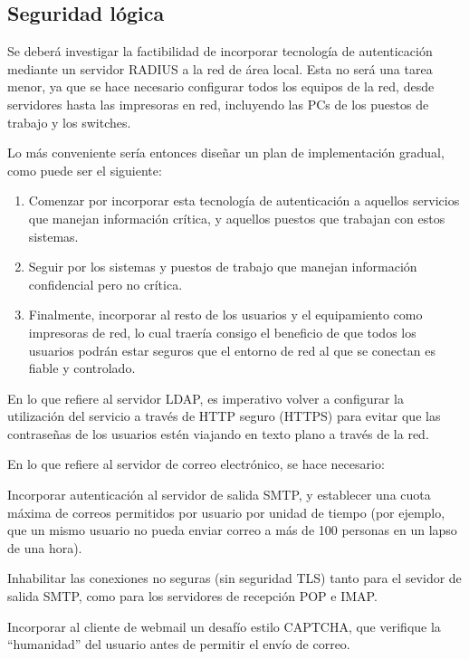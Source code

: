\documentclass[a4paper,11pt,oneside]{article}
\begin{document}
\subsection*{Seguridad lógica}
Se deberá investigar la factibilidad de incorporar tecnología de
autenticación mediante un servidor RADIUS a la red de área local.
Esta no será una tarea menor, ya que se hace necesario configurar todos
los equipos de la red, desde servidores hasta las impresoras en red, incluyendo
las PCs de los puestos de trabajo y los switches.

Lo más conveniente sería entonces diseñar un plan de implementación
gradual, como puede ser el siguiente:
\begin{enumerate}
\item Comenzar por incorporar esta tecnología de autenticación a
  aquellos servicios que manejan información crítica, y aquellos
  puestos que trabajan con estos sistemas.
\item Seguir por los sistemas y puestos de trabajo que manejan
  información confidencial pero no crítica.
\item Finalmente, incorporar al resto de los usuarios y el
  equipamiento como impresoras de red, lo cual traería consigo el
  beneficio de que todos los usuarios podrán estar seguros que el
  entorno de red al que se conectan es fiable y controlado.
\end{enumerate}

En lo que refiere al servidor LDAP, es imperativo volver a configurar
la utilización del servicio a través de HTTP seguro (HTTPS) para
evitar que las contraseñas de los usuarios estén viajando en texto
plano a través de la red.

En lo que refiere al servidor de correo electrónico, se hace necesario:
\begin{itemize*}
\item Incorporar autenticación al servidor de salida SMTP, y
  establecer una cuota máxima de correos permitidos por usuario por
  unidad de tiempo (por ejemplo, que un mismo usuario no pueda enviar
  correo a más de 100 personas en un lapso de una hora).
\item Inhabilitar las conexiones no seguras (sin seguridad TLS) tanto
  para el sevidor de salida SMTP, como para los servidores de
  recepción POP e IMAP.
\item Incorporar al cliente de webmail un desafío estilo CAPTCHA, que
  verifique la ``humanidad'' del usuario antes de permitir el envío de
  correo.
\end{itemize*}
\end{document}
